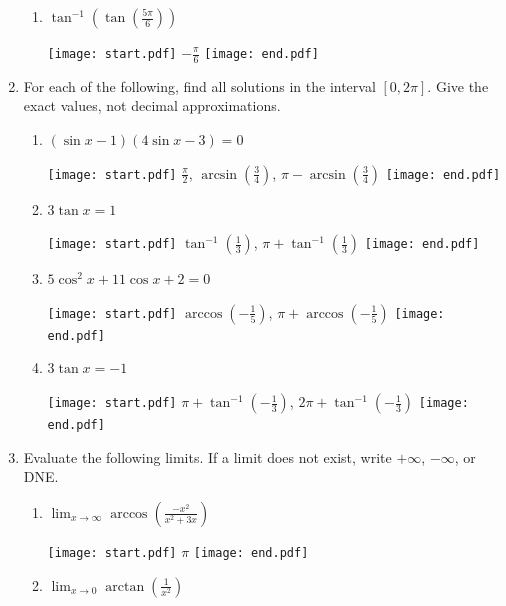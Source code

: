 \documentclass[12pt]{article}
\begin{document}
\begin{enumerate}
\begin{enumerate}
\item $\displaystyle \tan^{-1}{\left(\tan{\left(\frac{5\pi}{6}\right)}\right)}$

\texttt{[image: start.pdf]}
{$\displaystyle -\frac{\pi}{6}$}
\texttt{[image: end.pdf]}


\end{enumerate}

\newpage

\item For each of the following, find all solutions in the interval $[0,2\pi]$.  Give the exact values, not decimal approximations.

\begin{enumerate}

\item $(\sin{x}-1)(4\sin{x}-3) = 0$

\texttt{[image: start.pdf]}
{$\frac{\pi}{2}$, $\arcsin\left(\frac{3}{4}\right)$, $\pi-\arcsin\left(\frac{3}{4}\right)$}
\texttt{[image: end.pdf]}


\item $3\tan{x}=1$

\texttt{[image: start.pdf]}
{$\tan^{-1}\left(\frac{1}{3}\right)$, $\pi+\tan^{-1}\left(\frac{1}{3}\right)$}
\texttt{[image: end.pdf]}


\item $5\cos^2{x}+11\cos{x}+2=0$

\texttt{[image: start.pdf]}
{$\arccos\left(-\frac{1}{5}\right)$, $\pi+\arccos\left(-\frac{1}{5}\right)$}
\texttt{[image: end.pdf]}


\item $3\tan{x}=-1$

\texttt{[image: start.pdf]}
{$\pi+\tan^{-1}\left(-\frac{1}{3}\right)$, $2\pi+\tan^{-1}\left(-\frac{1}{3}\right)$}
\texttt{[image: end.pdf]}


\end{enumerate}

\item Evaluate the following limits.  If a limit does not exist, write $+\infty$, $-\infty$, or DNE.

\begin{enumerate}

\item $\displaystyle \lim_{x\rightarrow \infty}{\arccos{\left(\frac{-x^2}{x^2+3x}\right)}}$ 

\texttt{[image: start.pdf]}
{{$\displaystyle \pi$}}
\texttt{[image: end.pdf]}


\item $\displaystyle \lim_{x\rightarrow 0}{\arctan{\left(\frac{1}{x^2}\right)}}$ 


\end{enumerate}
\end{enumerate}
\end{document}
